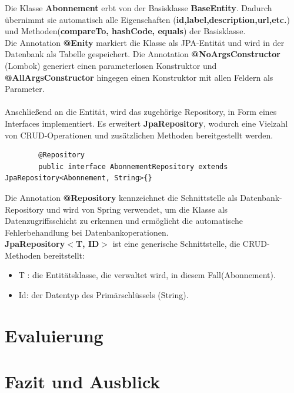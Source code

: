\documentclass[a4paper,12pt]{scrreprt}
\begin{document}
	Die Klasse \textbf{Abonnement} erbt von der Basisklasse \textbf{BaseEntity}. Dadurch übernimmt sie automatisch alle Eigenschaften (\textbf{id,label,description,url,etc.}) und Methoden(\textbf{compareTo, hashCode, equals}) der Basisklasse.\\
	Die Annotation \textbf{@Enity} markiert die Klasse als JPA-Entität und wird in der Datenbank als Tabelle gespeichert. Die Annotation \textbf{@NoArgsConstructor} (Lombok) generiert einen parameterlosen Konstruktor und \textbf{@AllArgsConstructor} hingegen einen Konstruktor mit allen Feldern als Parameter.\\ \\
	Anschließend an die Entität, wird das zugehörige Repository, in Form eines Interfaces implementiert. Es erweitert \textbf{JpaRepository}, wodurch eine Vielzahl von CRUD-Operationen und zusätzlichen Methoden bereitgestellt werden.
	\begin{lstlisting}
		@Repository
		public interface AbonnementRepository extends JpaRepository<Abonnement, String>{}
	\end{lstlisting}
	Die Annotation \textbf{@Repository} kennzeichnet die Schnittstelle als Datenbank-Repository und wird von Spring verwendet, um die Klasse als Datenzugriffsschicht zu erkennen und ermöglicht die automatische Fehlerbehandlung bei Datenbankoperationen.\\
	\textbf{JpaRepository$<$T, ID$>$} ist eine generische Schnittstelle, die CRUD-Methoden bereitstellt:
	\begin{itemize}
		\item T : die Entitätsklasse, die verwaltet wird, in diesem Fall(Abonnement).
		\item Id: der Datentyp des Primärschlüssels (String).
	\end{itemize}
	
	
	\chapter{Evaluierung}
	
	\chapter{Fazit und Ausblick}
	
	\printbibliography
\end{document}
